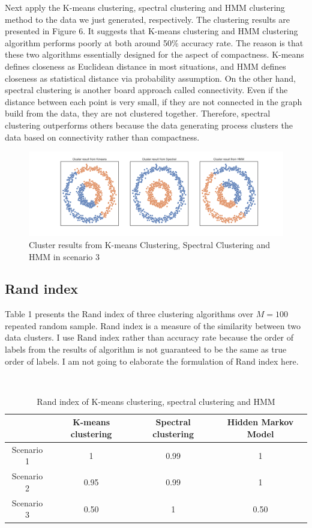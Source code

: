 \documentclass[a4paper]{article}
\begin{document}
Next apply the K-means clustering, spectral clustering and HMM clustering method to the data we just generated, respectively. The clustering results are presented in Figure 6. It suggests that K-means clustering and HMM clustering algorithm performs poorly at both around 50\% accuracy rate. The reason is that these two algorithms essentially designed for the aspect of compactness. K-means defines closeness as Euclidean distance in most situations, and HMM defines closeness as statistical distance via probability assumption. On the other hand, spectral clustering is another board approach called connectivity. Even if the distance between each point is very small, if they are not connected in the graph build from the data, they are not clustered together. Therefore, spectral clustering outperforms others because the data generating process clusters the data based on connectivity  rather than compactness.


\begin{figure}[h!]
  \centering
  \includegraphics[width=0.8\linewidth]{../Simu_results/sen3_clust.png}
  \caption{Cluster results from K-means Clustering, Spectral Clustering and HMM in scenario 3}
\end{figure}

\subsection{Rand index}

Table 1 presents the Rand index of three clustering algorithms over $M = 100$ repeated random sample. Rand index is a measure of the similarity between two data clusters.  I use Rand index rather than accuracy rate because the order of labels from the results of algorithm is not guaranteed to be the same as true order of labels. I am not going to elaborate the formulation of Rand index here. 

\

\begin{table}[h]
\centering
\begin{tabular}{|c|c|c|c|}
\hline
           & K-means clustering & Spectral clustering & Hidden Markov Model \\ \hline
Scenario 1 & 1                  & 0.99                & 1                   \\ \hline
Scenario 2 & 0.95               & 0.99                & 1                   \\ \hline
Scenario 3 & 0.50               & 1                   & 0.50                \\ \hline
\end{tabular}
\caption{Rand index of K-means clustering, spectral clustering and HMM}
\end{table}
\end{document}
